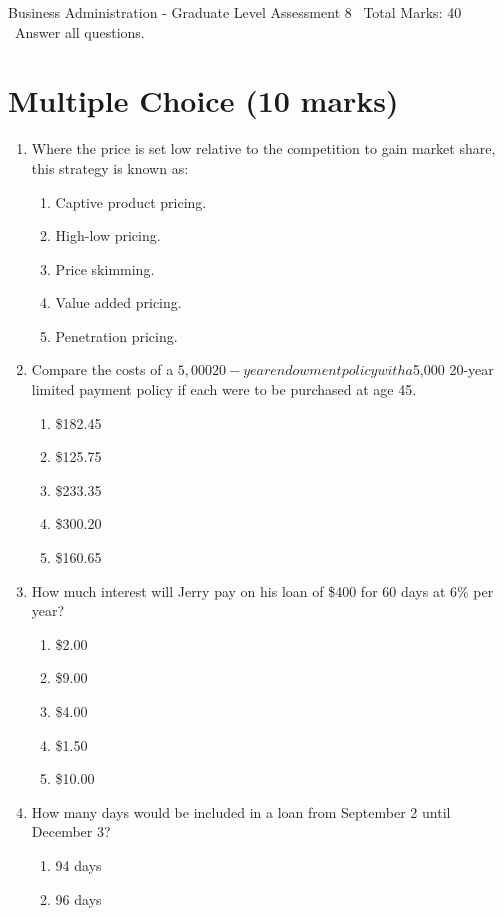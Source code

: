 \documentclass[12pt]{article}
\begin{document}
\begin{center}
Business Administration - Graduate Level Assessment 8 \
Total Marks: 40 \
Answer all questions.
\end{center}

\section*{Multiple Choice (10 marks)}
\begin{enumerate}[label=\arabic*.]
\item Where the price is set low relative to the competition to gain market share, this strategy is known as:
\begin{enumerate}[label=(\alph*)]
    \item Captive product pricing.
    \item High-low pricing.
    \item Price skimming.
    \item Value added pricing.
    \item Penetration pricing.
\end{enumerate}
\item Compare the costs of a $5,000 20-year endowment policy with a $5,000 20-year limited payment policy if each were to be purchased at age 45.
\begin{enumerate}[label=(\alph*)]
    \item \$182.45
    \item \$125.75
    \item \$233.35
    \item \$300.20
    \item \$160.65
\end{enumerate}
\item How much interest will Jerry pay on his loan of \$400 for 60 days at 6\% per year?
\begin{enumerate}[label=(\alph*)]
    \item \$2.00
    \item \$9.00
    \item \$4.00
    \item \$1.50
    \item \$10.00
\end{enumerate}
\item How many days would be included in a loan from September 2 until December 3?
\begin{enumerate}[label=(\alph*)]
    \item 94 days
    \item 96 days

\end{enumerate}
\end{enumerate}
\end{document}
